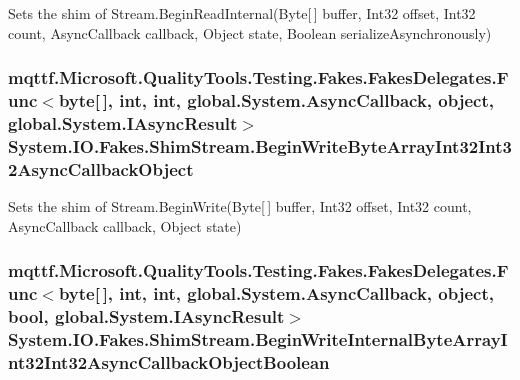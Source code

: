Sets the shim of Stream.\-Begin\-Read\-Internal(\-Byte\mbox{[}$\,$\mbox{]} buffer, Int32 offset, Int32 count, Async\-Callback callback, Object state, Boolean serialize\-Asynchronously)

\hypertarget{class_system_1_1_i_o_1_1_fakes_1_1_shim_stream_a012bc266f7e28551a044b4eef7c9d187}{
\subsubsection[{Begin\-Write\-Byte\-Array\-Int32\-Int32\-Async\-Callback\-Object}]{\setlength{\rightskip}{0pt plus 5cm}mqttf.\-Microsoft.\-Quality\-Tools.\-Testing.\-Fakes.\-Fakes\-Delegates.\-Func$<$byte\mbox{[}$\,$\mbox{]}, int, int, global.\-System.\-Async\-Callback, object, global.\-System.\-I\-Async\-Result$>$ System.\-I\-O.\-Fakes.\-Shim\-Stream.\-Begin\-Write\-Byte\-Array\-Int32\-Int32\-Async\-Callback\-Object\hspace{0.3cm}{\ttfamily [set]}}}\label{class_system_1_1_i_o_1_1_fakes_1_1_shim_stream_a012bc266f7e28551a044b4eef7c9d187}


Sets the shim of Stream.\-Begin\-Write(\-Byte\mbox{[}$\,$\mbox{]} buffer, Int32 offset, Int32 count, Async\-Callback callback, Object state)

\hypertarget{class_system_1_1_i_o_1_1_fakes_1_1_shim_stream_adf18beed382235c8b437e3109261e7d0}{
\subsubsection[{Begin\-Write\-Internal\-Byte\-Array\-Int32\-Int32\-Async\-Callback\-Object\-Boolean}]{\setlength{\rightskip}{0pt plus 5cm}mqttf.\-Microsoft.\-Quality\-Tools.\-Testing.\-Fakes.\-Fakes\-Delegates.\-Func$<$byte\mbox{[}$\,$\mbox{]}, int, int, global.\-System.\-Async\-Callback, object, bool, global.\-System.\-I\-Async\-Result$>$ System.\-I\-O.\-Fakes.\-Shim\-Stream.\-Begin\-Write\-Internal\-Byte\-Array\-Int32\-Int32\-Async\-Callback\-Object\-Boolean\hspace{0.3cm}{\ttfamily [set]}}}\label{class_system_1_1_i_o_1_1_fakes_1_1_shim_stream_adf18beed382235c8b437e3109261e7d0}


